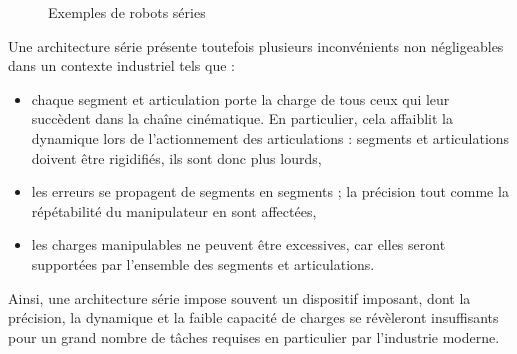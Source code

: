 \begin{figure}[!ht]
  \centering
       \hfill
    \caption{\footnotesize{Exemples de robots séries}}
\label{intro:fig2}
\end{figure}

Une architecture série présente toutefois plusieurs inconvénients non négli\-gea\-bles dans un contexte industriel tels que :
\begin{itemize}
 \item chaque segment et articulation porte la charge de tous ceux qui leur succèdent dans la chaîne cinématique. En particulier, cela affaiblit la dynamique lors de l'actionnement des articulations : segments et articulations doivent être rigidifiés, ils sont donc plus lourds, 
 \item les erreurs se propagent de segments en segments ; la précision tout comme la répétabilité du manipulateur en sont affectées,
 \item les charges manipulables ne peuvent être excessives, car elles seront supportées par l'ensemble des segments et articulations.
\end{itemize}

Ainsi, une architecture série impose souvent un dispositif imposant, dont la précision, la dynamique et la faible capacité de charges se révèleront insuffisants pour un grand nombre de tâches requises en particulier par l'industrie moderne.

